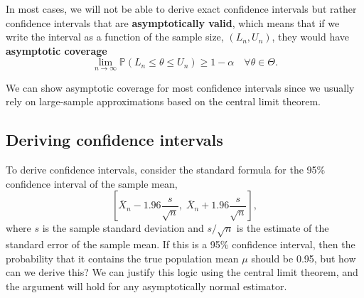 \documentclass[
  13pt,
  letterpaper,
  DIV=11,
  numbers=noendperiod]{scrreprt}
\renewcommand{\P}{\mathbb{P}}
\newcommand{\Xbar}{\overline{X}}
\theoremstyle{definition}
\theoremstyle{definition}
\theoremstyle{plain}
\theoremstyle{remark}
\begin{document}
In most cases, we will not be able to derive exact confidence intervals
but rather confidence intervals that are \textbf{asymptotically valid},
which means that if we write the interval as a function of the sample
size, \((L_n, U_n)\), they would have \textbf{asymptotic coverage} \[
\lim_{n\to\infty} \P(L_n \leq \theta \leq U_n) \geq 1-\alpha \quad\forall\theta\in\Theta.
\]

We can show asymptotic coverage for most confidence intervals since we
usually rely on large-sample approximations based on the central limit
theorem.

\subsection{Deriving confidence
intervals}\label{deriving-confidence-intervals}

To derive confidence intervals, consider the standard formula for the
95\% confidence interval of the sample mean, \[ 
\left[\Xbar_n - 1.96\frac{s}{\sqrt{n}},\; \Xbar_n + 1.96\frac{s}{\sqrt{n}}\right],
\] where \(s\) is the sample standard deviation and \(s/\sqrt{n}\) is
the estimate of the standard error of the sample mean. If this is a 95\%
confidence interval, then the probability that it contains the true
population mean \(\mu\) should be 0.95, but how can we derive this? We
can justify this logic using the central limit theorem, and the argument
will hold for any asymptotically normal estimator.
\end{document}
